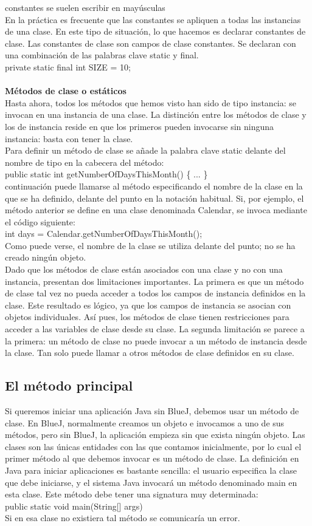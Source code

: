 \documentclass[11pt,a4paper]{article}
\begin{document}
constantes se suelen escribir en mayúsculas\\
En la práctica es frecuente que las constantes se apliquen a todas las instancias de una clase. En
este tipo de situación, lo que hacemos es declarar constantes de clase. Las constantes de clase son
campos de clase constantes. Se declaran con una combinación de las palabras clave static y
final.\\
private static final int SIZE = 10;\\
\\
\textbf{Métodos de clase o estáticos}\\
Hasta ahora, todos los métodos que hemos visto han sido de tipo instancia: se invocan en una
instancia de una clase. La distinción entre los métodos de clase y los de instancia reside en que los
primeros pueden invocarse sin ninguna instancia: basta con tener la clase.\\
Para definir un método de clase se añade la palabra clave static delante del nombre de tipo en la
cabecera del método:\\
public static int getNumberOfDaysThisMonth()
\{
	...
\}\\
continuación puede llamarse al método especificando el nombre de la clase en la que se ha definido,
delante del punto en la notación habitual. Si, por ejemplo, el método anterior se define en una
clase denominada Calendar, se invoca mediante el código siguiente:\\
int days = Calendar.getNumberOfDaysThisMonth();\\
Como puede verse, el nombre de la clase se utiliza delante del punto; no se ha creado ningún
objeto.\\
Dado que los métodos de clase están asociados con una clase y no con una instancia, presentan
dos limitaciones importantes. La primera es que un método de clase tal vez no pueda acceder a
todos los campos de instancia definidos en la clase. Este resultado es lógico, ya que los campos de
instancia se asocian con objetos individuales. Así pues, los métodos de clase tienen restricciones
para acceder a las variables de clase desde su clase. La segunda limitación se parece a la primera:
un método de clase no puede invocar a un método de instancia desde la clase. Tan solo puede llamar
a otros métodos de clase definidos en su clase.
\subsection{El método principal}
Si queremos iniciar una aplicación Java sin BlueJ, debemos usar un método de clase. En BlueJ,
normalmente creamos un objeto e invocamos a uno de sus métodos, pero sin BlueJ, la aplicación
empieza sin que exista ningún objeto. Las clases son las únicas entidades con las que contamos
inicialmente, por lo cual el primer método al que debemos invocar es un método de clase.
La definición en Java para iniciar aplicaciones es bastante sencilla: el usuario especifica la clase
que debe iniciarse, y el sistema Java invocará un método denominado main en esta clase. Este
método debe tener una signatura muy determinada:\\
public static void main(String[] args)\\
Si en esa clase no existiera tal método se comunicaría un error.
\end{document}
